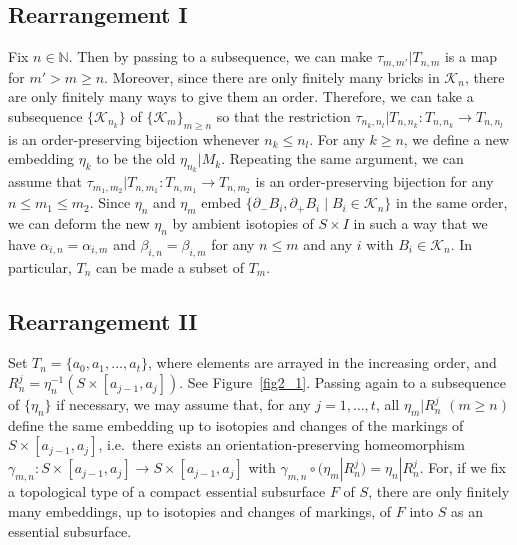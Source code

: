 \documentclass{amsart}
\theoremstyle{definition}
\numberwithin{figure}{section}
\numberwithin{equation}{section}
\newcommand{\blackboard}[1]{\ensuremath{\mathbb{#1}}}
\newcommand{\naturals}{\blackboard{N}}
\newcommand{\ie}{i.e.\ }
\def\ck{\mathcal{K}}
\def\Sg{\Sigma}
\def\Sg{\Sigma}
\begin{document}
\subsection*{Rearrangement I}
Fix $n \in \naturals$.
Then by passing to a subsequence, we can make $\tau_{m, m'}|T_{n, m}$ is a map for $m' > m \geq n$.
Moreover, since there are only finitely many bricks in $\ck_n$, there are only finitely many ways to give them an order.
Therefore,  we can take a subsequence $\{\ck_{n_k}\}$ of $\{\ck_m\}_{m\geq n}$ so that the restriction $\tau_{n_k,n_l}|T_{n,n_k}:T_{n,n_k}\rightarrow T_{n,n_l}$ is an order-preserving bijection whenever  
$n_k\leq n_l$. 
For any $k \geq n$, we define a new embedding  $\eta_k$ to be the old $\eta_{n_k}|M_k$.
Repeating the same argument, we can assume that $\tau_{m_1,m_2}|T_{n,m_1}:T_{n,m_1}\rightarrow T_{n,m_2}$ is 
an order-preserving bijection for any $n\leq m_1\leq m_2$.
Since $\eta_n$ and $\eta_m$ embed    $\{\partial_- B_i,\partial_+ B_i \mid B_i \in \ck_n\}$ in the same order, we can deform the new $\eta_n$  by ambient isotopies of $S\times I$ in such a way that we have
$\alpha_{i,n}=\alpha_{i,m}$ and $\beta_{i,n}=\beta_{i,m}$ for any $n\leq m$ and any $i$ with $B_i\in \ck_n$.
In particular,  $T_n$ can be made a subset of $T_m$.

\bigskip





\subsection*{Rearrangement II}
Set $T_n=\{a_0,a_1,\dots,a_t\}$, where elements are arrayed in the increasing order, and $R^j_n=\eta_n^{-1}(S\times [a_{j-1},a_j])$.
See Figure\ \ref{fig2_1}.
Passing again to a subsequence of $\{\eta_n\}$ if necessary, we may assume that, for any $j=1,\dots,t$, 
all $\eta_m|R^j_n$ $(m\geq n)$ define 
the same embedding up to isotopies and changes of  the markings of $S\times [a_{j-1},a_j]$, \ie there exists an orientation-preserving 
homeomorphism $\gamma_{m,n}:S \times [a_{j-1},a_j]\rightarrow S\times [a_{j-1},a_j]$ with 
$\gamma_{m,n}\circ (\eta_m|R^j_n)=\eta_{n}|R^j_n$.
For, if we fix a topological type of a compact essential subsurface $F$ of $S$, there are only finitely many embeddings, up to isotopies and  changes of markings, of $F$ into $S$ as an essential subsurface.
\end{document}
